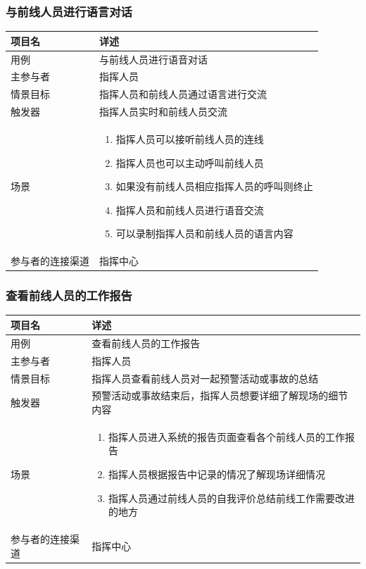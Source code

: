\documentclass{ctexrep}
\begin{document}
\subsubsection{与前线人员进行语言对话}
\begin{longtable}{p{2cm} | p{10cm}}
\hline
项目名 & 详述 \\
\hline
\hline
用例 & 与前线人员进行语音对话\\
\hline
主参与者 & 指挥人员 \\
\hline
情景目标 &  指挥人员和前线人员通过语言进行交流\\
\hline
触发器 &  指挥人员实时和前线人员交流\\
\hline
场景 & \begin{enumerate}
	\item 指挥人员可以接听前线人员的连线
	\item 指挥人员也可以主动呼叫前线人员
	\item 如果没有前线人员相应指挥人员的呼叫则终止
	\item 指挥人员和前线人员进行语音交流
	\item 可以录制指挥人员和前线人员的语言内容
\end{enumerate} \\
\hline
参与者的连接渠道 & 指挥中心 \\
\hline
\end{longtable}

\subsubsection{查看前线人员的工作报告}
\begin{longtable}{p{2cm} | p{10cm}}
\hline
项目名 & 详述 \\
\hline
\hline
用例 & 查看前线人员的工作报告\\
\hline
主参与者 & 指挥人员 \\
\hline
情景目标 &  指挥人员查看前线人员对一起预警活动或事故的总结\\
\hline
触发器 &  预警活动或事故结束后，指挥人员想要详细了解现场的细节内容\\
\hline
场景 & \begin{enumerate}
	\item 指挥人员进入系统的报告页面查看各个前线人员的工作报告
	\item 指挥人员根据报告中记录的情况了解现场详细情况
	\item 指挥人员通过前线人员的自我评价总结前线工作需要改进的地方
\end{enumerate} \\
\hline
参与者的连接渠道 & 指挥中心 \\
\hline
\end{longtable}
\end{document}
